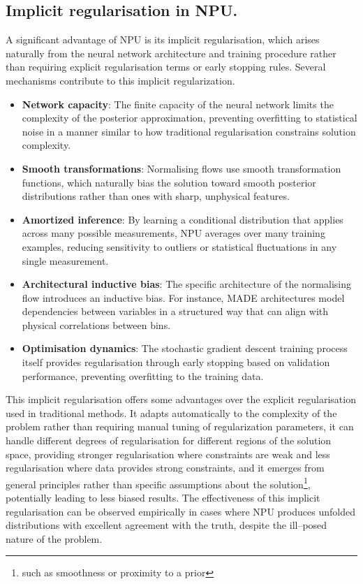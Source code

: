 \subsection{Implicit regularisation in NPU.}
    A significant advantage of NPU is its implicit regularisation, which arises naturally from the neural network architecture and training procedure rather than requiring explicit regularisation terms or early stopping rules.
    Several mechanisms contribute to this implicit regularization.
    \begin{itemize}
        \item \textbf{Network capacity}: The finite capacity of the neural network limits the complexity of the posterior approximation, preventing overfitting to statistical noise in a manner similar to how traditional regularisation constrains solution complexity.
        \item \textbf{Smooth transformations}: Normalising flows use smooth transformation functions, which naturally bias the solution toward smooth posterior distributions rather than ones with sharp, unphysical features.
        \item \textbf{Amortized inference}: By learning a conditional distribution that applies across many possible measurements, NPU averages over many training examples, reducing sensitivity to outliers or statistical fluctuations in any single measurement.
        \item \textbf{Architectural inductive bias}: The specific architecture of the normalising flow introduces an inductive bias.
        For instance, MADE architectures model dependencies between variables in a structured way that can align with physical correlations between bins.
        \item \textbf{Optimisation dynamics}: The stochastic gradient descent training process itself provides regularisation through early stopping based on validation performance, preventing overfitting to the training data.
    \end{itemize}
    This implicit regularisation offers some advantages over the explicit regularisation used in traditional methods.
    It adapts automatically to the complexity of the problem rather than requiring manual tuning of regularization parameters,
    it can handle different degrees of regularisation for different regions of the solution space, providing stronger regularisation where constraints are weak and less regularisation where data provides strong constraints, and
    it emerges from general principles rather than specific assumptions about the solution\footnote{such as smoothness or proximity to a prior}, potentially leading to less biased results.
    The effectiveness of this implicit regularisation can be observed empirically in cases where NPU produces unfolded distributions with excellent agreement with the truth, despite the ill--posed nature of the problem.

